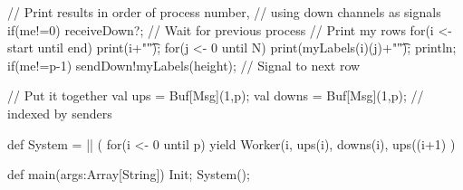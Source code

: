 \begin{answer}
\begin{scala}
{{    // Print results in order of process number, 
    // using down channels as signals
    if(me!=0) receiveDown?; // Wait for previous process
    // Print my rows
    for(i <- start until end){
      print(i+"\t");
      for(j <- 0 until N) print(myLabels(i)(j)+"\t");
      println;
    }
    if(me!=p-1) sendDown!myLabels(height); // Signal to next row
  }

  // Put it together
  val ups = Buf[Msg](1,p); val downs = Buf[Msg](1,p); 
    // indexed by senders

  def System = 
    || ( for(i <- 0 until p) yield 
        Worker(i, ups(i), downs(i), 
               ups((i+1)%
      )

  def main(args:Array[String]){
    Init; System();
  }
}
\end{scala}













\end{answer}
